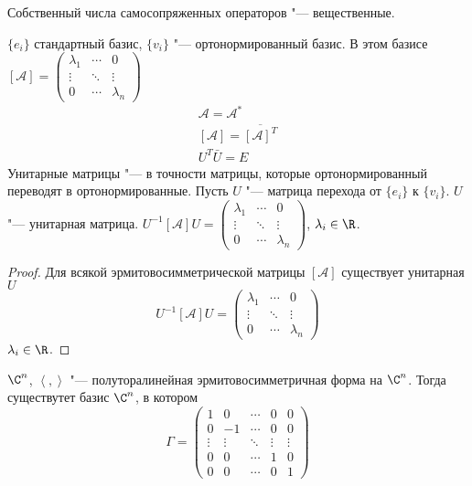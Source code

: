 \begin{conseq}
	Собственный числа самосопряженных операторов "--- вещественные.
\end{conseq}
$\{e_i\}$ стандартный базис, $\{v_i\}$ "--- ортонормированный базис.
В этом базисе
$
	[\mathcal A] = \begin{pmatrix}
		\lambda_1 & \cdots & 0 \\
		\vdots & \ddots & \vdots \\
		0 & \cdots & \lambda_n
	\end{pmatrix}
$
\begin{gather*}
	\mathcal A = \mathcal{A}^* \\
	[\mathcal A] = \overline{[\mathcal A]^T} \\
	U^T\bar U = E
\end{gather*}
Унитарные матрицы "--- в точности матрицы, которые ортонормированный переводят в ортонормированные.
Пусть $U$ "--- матрица перехода от $\{e_i\}$ к $\{v_i\}$.
$U$  "--- унитарная матрица.
$
	U^{-1} [\mathcal A] U = \begin{pmatrix}
		\lambda_1 & \cdots & 0 \\
		\vdots & \ddots & \vdots \\
		0 & \cdots & \lambda_n
	\end{pmatrix}
$, $\lambda_i \in \R$.

\begin{proof}
	Для всякой эрмитовосимметрической матрицы  $[\mathcal A]$ существует унитарная $U$
	\[
		U^{-1}[\mathcal A]U = \begin{pmatrix}
			\lambda_1 & \cdots & 0 \\
			\vdots & \ddots & \vdots \\
			0 & \cdots & \lambda_n
		\end{pmatrix}
	\]
	$\lambda_i \in \R$.
\end{proof}

\begin{theorem}
	$\C^n$, $\left<,\right>$ "--- полуторалинейная эрмитовосимметричная форма на $\C^n$.
	Тогда существутет базис $\C^n$, в котором
	\[
		\Gamma = \begin{pmatrix}
			1 & 0 &\cdots & 0 & 0 \\
			0 &-1 &\cdots & 0 & 0 \\
			\vdots&\vdots &\ddots&\vdots&\vdots\\
			0 & 0 &\cdots & 1 & 0 \\
			0 & 0 &\cdots & 0 & 1
		\end{pmatrix}
	\]
\end{theorem}

